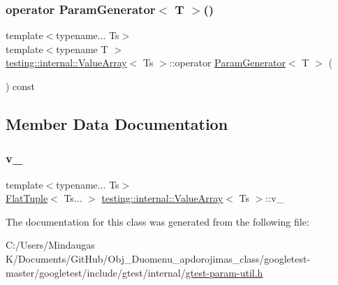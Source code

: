 \subsubsection{\texorpdfstring{operator ParamGenerator$<$ T $>$()}{operator ParamGenerator< T >()}\hspace{0.1cm}{\footnotesize\ttfamily [2/2]}}
{\footnotesize\ttfamily template$<$typename... Ts$>$ \\
template$<$typename T $>$ \\
\mbox{\hyperlink{classtesting_1_1internal_1_1_value_array}{testing\+::internal\+::\+Value\+Array}}$<$ Ts $>$\+::operator \mbox{\hyperlink{classtesting_1_1internal_1_1_param_generator}{Param\+Generator}}$<$ T $>$ (\begin{DoxyParamCaption}{ }\end{DoxyParamCaption}) const\hspace{0.3cm}{\ttfamily [inline]}}



\subsection{Member Data Documentation}
\mbox{\label{classtesting_1_1internal_1_1_value_array_a98bb920948e1db4ad15cb443cfc84e7b}} 
\subsubsection{\texorpdfstring{v\_}{v\_}}
{\footnotesize\ttfamily template$<$typename... Ts$>$ \\
\mbox{\hyperlink{classtesting_1_1internal_1_1_flat_tuple}{Flat\+Tuple}}$<$ Ts... $>$ \mbox{\hyperlink{classtesting_1_1internal_1_1_value_array}{testing\+::internal\+::\+Value\+Array}}$<$ Ts $>$\+::v\+\_\+\hspace{0.3cm}{\ttfamily [private]}}



The documentation for this class was generated from the following file\+:\begin{DoxyCompactItemize}
\item 
C\+:/\+Users/\+Mindaugas K/\+Documents/\+Git\+Hub/\+Obj\+\_\+\+Duomenu\+\_\+apdorojimas\+\_\+class/googletest-\/master/googletest/include/gtest/internal/\mbox{\hyperlink{googletest-master_2googletest_2include_2gtest_2internal_2gtest-param-util_8h}{gtest-\/param-\/util.\+h}}\end{DoxyCompactItemize}
